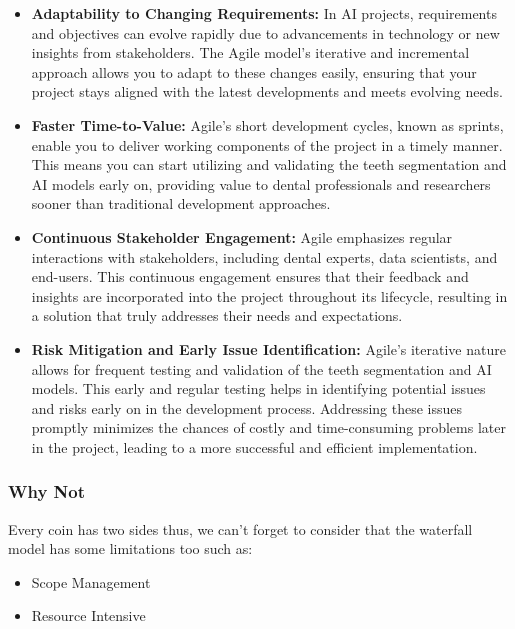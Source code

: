 \begin{itemize}
    \item \textbf{Adaptability to Changing Requirements:}  In AI projects, requirements and objectives can evolve rapidly due to advancements in technology or new insights from stakeholders. The Agile model's iterative and incremental approach allows you to adapt to these changes easily, ensuring that your project stays aligned with the latest developments and meets evolving needs.

    \item \textbf{Faster Time-to-Value:} Agile's short development cycles, known as sprints, enable you to deliver working components of the project in a timely manner. This means you can start utilizing and validating the teeth segmentation and AI models early on, providing value to dental professionals and researchers sooner than traditional development approaches.

    \item \textbf{ Continuous Stakeholder Engagement:} Agile emphasizes regular interactions with stakeholders, including dental experts, data scientists, and end-users. This continuous engagement ensures that their feedback and insights are incorporated into the project throughout its lifecycle, resulting in a solution that truly addresses their needs and expectations.
    \item \textbf{Risk Mitigation and Early Issue Identification: } Agile's iterative nature allows for frequent testing and validation of the teeth segmentation and AI models. This early and regular testing helps in identifying potential issues and risks early on in the development process. Addressing these issues promptly minimizes the chances of costly and time-consuming problems later in the project, leading to a more successful and efficient implementation.

\end{itemize}

\subsubsection{Why Not}
Every coin has two sides thus, we can't forget to consider that the waterfall model has some limitations too such as:
\begin{itemize}
    \item Scope Management
    \item Resource Intensive   
\end{itemize}


